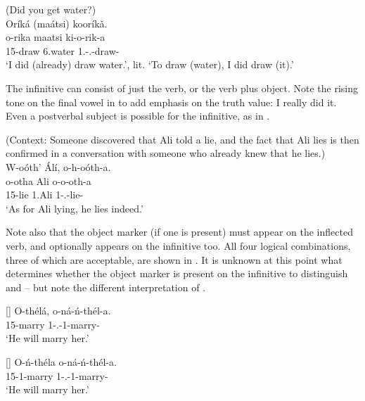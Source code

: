 \documentclass[output=paper]{langscibook}
\begin{document}
\ea
\label{bkm:Ref95391381}
\label{bkm:Ref117581626}(Did you get water?)\\
Oríká (maátsi) kooríkǎ.\\
\gll
o-rika  maatsi  ki-o-rik-a\\
15-draw  6.water  1\SG{}.\SM{}-\PFV{}.\DJ{}-draw-\FV{}\\
\glt
‘I did (already) draw water.’, lit. ‘To draw (water), I did draw (it).’\\


\z

The infinitive can consist of just the verb, or the verb plus object. Note the rising tone on the final vowel in  to add emphasis on the truth value: I really did it. Even a postverbal subject is possible for the infinitive, as in .

\ea
\label{bkm:Ref110331747}
(Context: Someone discovered that Ali told a lie, and the fact that Ali lies is then confirmed in a conversation with someone who already knew that he lies.)\\
W-oóth’ Álí, o-h-oóth-a.\\
\gll
o-otha  Ali  o-o-oth-a\\
15-lie  1.Ali  1\SM{}-\PFV{}.\DJ{}-lie-\FV{}\\
\glt
‘As for Ali lying, he lies indeed.’

\z

Note also that the object marker (if one is present) must appear on the inflected verb, and optionally appears on the infinitive too. All four logical combinations, three of which are acceptable, are shown in . It is unknown at this point what determines whether the object marker is present on the infinitive to distinguish  and  – but note the different interpretation of .

\ea
\label{bkm:Ref110331585}
\ea
[]{
\label{bkm:Ref110331585:a}
{\gll
O-thélá,  o-ná-ń-thél-a.  \\
15-marry  1\SM{}-\PRS{}.\DJ{}-1\OM{}-marry-\FV{}\\
}\jambox[1in]{[--OM,+OM]}
\glt
‘He will marry her.’\\
}

\ex
[]{
\label{bkm:Ref110331585:b}
{\gll
O-ń-théla  o-ná-ń-thél-a.        \\
15-1\OM{}-marry  1\SM{}-\PRS{}.\DJ{}-1\OM{}-marry-\FV{}\\
}\jambox[1in]{[+OM,+OM]}
\glt
‘He will marry her.’\\
}
\end{document}
